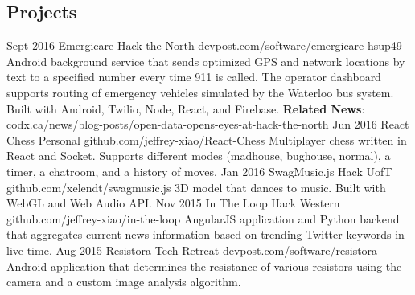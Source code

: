 \documentclass{resume}
\begin{document}
\begin{main}
    \section{Projects}
      \begin{entrylist}
        \rightentry%
          {Sept 2016}%
          {Emergicare}%
          {Hack the North}%
          {devpost.com/software/emergicare-hsup49}%
          {%
            Android background service that sends optimized GPS and network locations %
            by text to a specified number every time 911 is called. The operator %
            dashboard supports routing of emergency vehicles simulated by the Waterloo %
            bus system. Built with Android, Twilio, Node, React, and Firebase. %
            \textbf{Related News}: \color{lightred}codx.ca/news/blog-posts/open-data-opens-eyes-at-hack-the-north%
          }
        \rightentry%
          {Jun 2016}%
          {React Chess}%
          {Personal}%
          {github.com/jeffrey-xiao/React-Chess}%
          {%
            Multiplayer chess written in React and Socket. Supports different modes %
            (madhouse, bughouse, normal), a timer, a chatroom, and a history of moves.%
          }
        \rightentry%
          {Jan 2016}%
          {SwagMusic.js}%
          {Hack UofT}%
          {github.com/xelendt/swagmusic.js}%
          {%
            3D model that dances to music. Built with WebGL and Web Audio API.%
          }
        \rightentry%
          {Nov 2015}%
          {In The Loop}%
          {Hack Western}%
          {github.com/jeffrey-xiao/in-the-loop}%
          {%
            AngularJS application and Python backend that aggregates current news %
            information based on trending Twitter keywords in live time.%
          }
        \rightentry%
          {Aug 2015}%
          {Resistora}%
          {Tech Retreat}%
          {devpost.com/software/resistora}%
          {%
            Android application that determines the resistance of various resistors %
            using the camera and a custom image analysis algorithm.%
          }
      \end{entrylist}
  \end{main}
\end{document}
